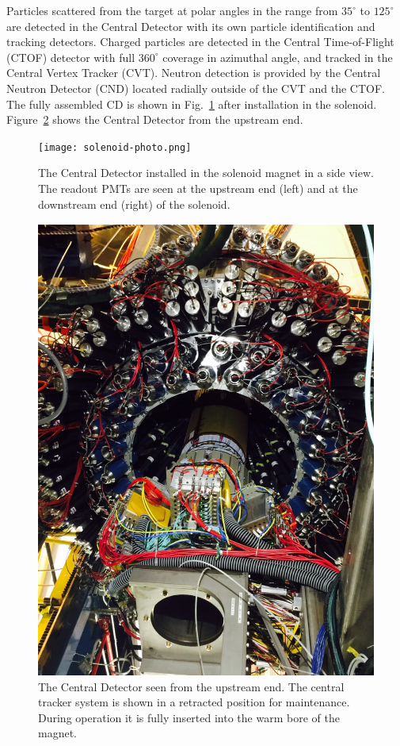 \documentclass[final,3p,twocolumn]{elsarticle}
\begin{document}
Particles scattered from the target at polar angles in the range from $35^\circ$  to $125^\circ$ are detected in the
Central Detector with its own particle identification and tracking detectors. Charged particles are detected in the
Central Time-of-Flight (CTOF) detector with full $360^\circ$ coverage in azimuthal angle, and tracked in the Central
Vertex Tracker (CVT). Neutron detection is provided by the Central Neutron Detector (CND) located radially outside
of the CVT and the CTOF.  The fully assembled CD is shown in Fig.~\ref{CDinSol} after installation in the solenoid.
Figure~\ref{CDback} shows the Central Detector from the upstream end.

\begin{figure}[htbp!]
\centerline{\texttt{[image: solenoid-photo.png]}}
\caption{The Central Detector installed in the solenoid magnet in a side view. The readout PMTs are seen at the
  upstream end (left) and at the downstream end (right) of the solenoid.}
\label{CDinSol}
\end{figure}

\begin{figure}[htbp!]
\centerline{\includegraphics[width=1.0\columnwidth]{CLAS12-CD.png}}
\caption{The Central Detector seen from the upstream end. The central tracker system is shown in a retracted
  position for maintenance. During operation it is fully inserted into the warm bore of the magnet.}
\label{CDback}
\end{figure}
\end{document}
